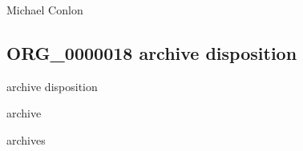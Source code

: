\documentclass[letterpaper,10pt,english]{sphinxmanual}
\begin{document}
\begin{sphinxShadowBox}

\sphinxAtStartPar
{}

\sphinxAtStartPar
{}
\end{sphinxShadowBox}

\begin{sphinxShadowBox}

\sphinxAtStartPar
Michael Conlon 
\end{sphinxShadowBox}
\begin{quote}

\ignorespaces \end{quote}


\subsection{ORG\_0000018 \sphinxhyphen{} archive disposition}
\label{\detokenize{doc-ORG_0000018:org-0000018-archive-disposition}}\label{\detokenize{doc-ORG_0000018:index-0}}\label{\detokenize{doc-ORG_0000018::doc}}
\begin{sphinxShadowBox}

\sphinxAtStartPar
archive disposition
\end{sphinxShadowBox}

\begin{sphinxShadowBox}

\sphinxAtStartPar
archive
\end{sphinxShadowBox}

\begin{sphinxShadowBox}

\sphinxAtStartPar
archives
\end{sphinxShadowBox}

\begin{sphinxShadowBox}

\sphinxAtStartPar
{\hyperref[\detokenize{doc-BFO_0000016::doc}]{}}
\end{sphinxShadowBox}
\end{document}
